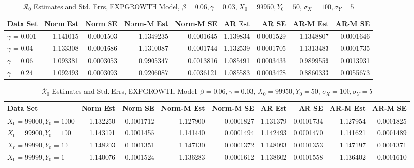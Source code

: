 \documentclass[12pt]{article}
\newcommand{\rr}{\ensuremath{\mathcal{R}_0}}
\begin{document}
\begin{table}[H]
	
	\caption{\label{tab:}$\rr$ Estimates and Std. Errs, EXPGROWTH Model,
		$\beta = 0.06, \gamma = 0.03$, $X_0 = 99950, Y_0 = 50$, $\sigma_X = 100, \sigma_Y = 5$}
	\centering
	\begin{tabular}[t]{l|r|r|r|r|r|r|r|r}
		\hline
		Data Set & Norm Est & Norm SE & Norm-M Est & Norm-M SE & AR Est & AR SE & AR-M Est & AR-M SE\\
		\hline
		$\gamma$ = 0.001 & 1.141015 & 0.0001503 & 1.1349235 & 0.0001645 & 1.139834 & 0.0001529 & 1.1348807 & 0.0001646\\
		\hline
		$\gamma$ = 0.04 & 1.133308 & 0.0001686 & 1.1310087 & 0.0001744 & 1.132539 & 0.0001705 & 1.1313483 & 0.0001735\\
		\hline
		$\gamma$ = 0.06 & 1.093381 & 0.0003053 & 0.9905347 & 0.0013816 & 1.085491 & 0.0003433 & 0.9899559 & 0.0013931\\
		\hline
		$\gamma$ = 0.24 & 1.092493 & 0.0003093 & 0.9206087 & 0.0036121 & 1.085583 & 0.0003428 & 0.8860333 & 0.0055673\\
		\hline
	\end{tabular}
\end{table}

\begin{table}[H]
	
	\caption{\label{tab:}$\rr$ Estimates and Std. Errs, EXPGROWTH Model,
		$\beta = 0.06, \gamma = 0.03$, $X_0 = 99950, Y_0 = 50$, $\sigma_X = 100, \sigma_Y = 5$}
	\centering
	\begin{tabular}[t]{l|r|r|r|r|r|r|r|r}
		\hline
		Data Set & Norm Est & Norm SE & Norm-M Est & Norm-M SE & AR Est & AR SE & AR-M Est & AR-M SE\\
		\hline
		$X_0 = 99000, Y_0 = 1000$ & 1.132250 & 0.0001712 & 1.127900 & 0.0001827 & 1.131379 & 0.0001734 & 1.127954 & 0.0001825\\
		\hline
		$X_0 = 99900, Y_0 = 100$ & 1.143191 & 0.0001455 & 1.141440 & 0.0001494 & 1.142493 & 0.0001470 & 1.141621 & 0.0001489\\
		\hline
		$X_0 = 99990, Y_0 = 10$ & 1.148203 & 0.0001351 & 1.147130 & 0.0001372 & 1.148093 & 0.0001353 & 1.147197 & 0.0001371\\
		\hline
		$X_0 = 99999, Y_0 = 1$& 1.140076 & 0.0001524 & 1.136283 & 0.0001612 & 1.138602 & 0.0001558 & 1.136402 & 0.0001610\\
		\hline
	\end{tabular}
\end{table}
\end{document}
